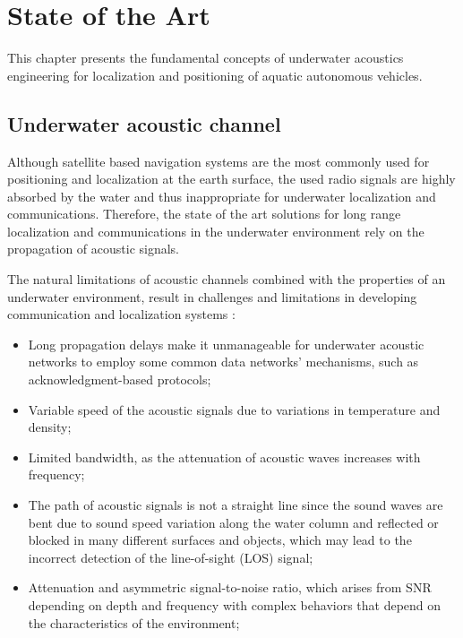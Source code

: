 \chapter{State of the Art} \label{chap:sota}

This chapter presents the fundamental concepts of underwater acoustics engineering for localization and positioning of aquatic autonomous vehicles.

\section{Underwater acoustic channel} \label{subsec: acoustic-channel}

Although satellite based navigation systems are the most commonly used for positioning and localization at the earth surface, the used radio signals are highly absorbed by the water and thus inappropriate for underwater localization and communications. Therefore, the state of the art solutions for long range localization and communications in the underwater environment rely on the propagation of acoustic signals.

The natural limitations of acoustic channels combined with the properties of an underwater environment, result in challenges and limitations in developing communication and localization systems \cite{survey-tech-chall}:
\begin{itemize}
	\item Long propagation delays make it unmanageable for underwater acoustic networks to employ some common data networks' mechanisms, such as acknowledgment-based protocols;
	
	\item Variable speed of the acoustic signals due to variations in temperature and density;
	
	\item Limited bandwidth, as the attenuation of acoustic waves increases with frequency;
	
	\item The path of acoustic signals is not a straight line since the sound waves are bent due to sound speed variation along the water column and reflected or blocked in many different surfaces and objects, which may lead to the incorrect detection of the line-of-sight (LOS) signal;
	
	\item Attenuation and asymmetric signal-to-noise ratio, which arises from SNR depending on depth and frequency with complex behaviors that depend on the characteristics of the environment;
\end{itemize}


